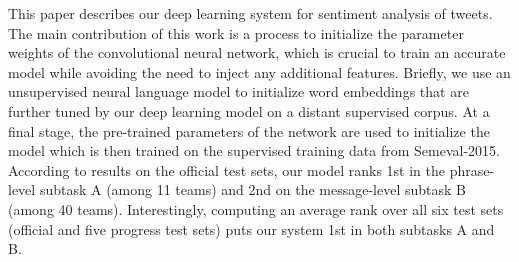 This paper describes our deep learning system for sentiment analysis of tweets. The main contribution of this work is a process to initialize the parameter weights of the convolutional neural network, which is crucial to train an accurate model while avoiding the need to inject any additional features. Briefly, we use an unsupervised neural language model to initialize word embeddings that are further tuned by our deep learning model on a distant supervised corpus. At a final stage, the pre-trained parameters of the network are used to initialize the model which is then trained on the supervised training data from Semeval-2015. According to results on the official test sets, our model ranks 1st in the phrase-level subtask A (among 11 teams) and 2nd on the message-level subtask B (among 40 teams). Interestingly, computing an average rank over all six test sets (official              and five progress test sets) puts our system 1st in both subtasks A and B.
